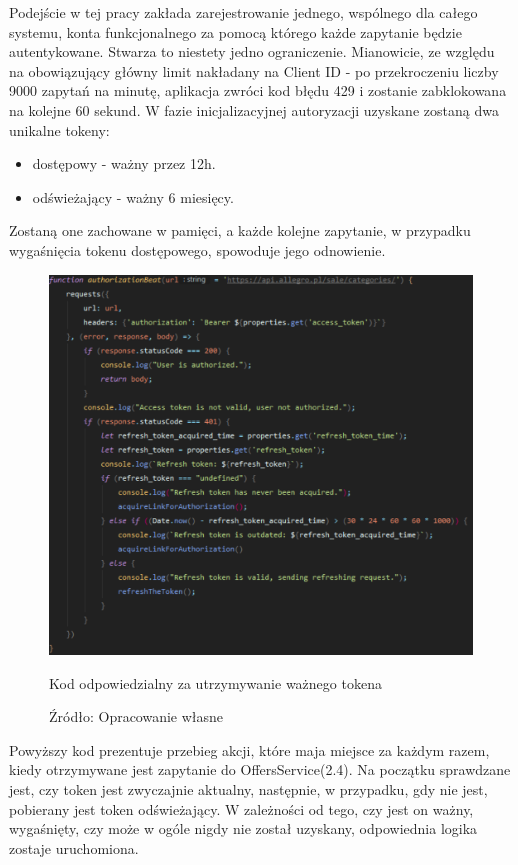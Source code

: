 Podejście w tej pracy zakłada zarejestrowanie jednego, wspólnego dla całego systemu, konta funkcjonalnego za pomocą którego każde zapytanie będzie autentykowane. Stwarza to niestety jedno ograniczenie. Mianowicie, ze względu na obowiązujący główny limit nakładany na Client ID  - po przekroczeniu liczby 9000 zapytań na minutę, aplikacja zwróci kod błędu 429 i zostanie zabklokowana na kolejne 60 sekund.
W fazie inicjalizacyjnej autoryzacji uzyskane zostaną dwa unikalne tokeny: 
\begin{itemize}
	\item dostępowy - ważny przez 12h.
	\item odświeżający - ważny 6 miesięcy.
\end{itemize}
Zostaną one zachowane w pamięci, a każde kolejne zapytanie, w przypadku wygaśnięcia tokenu dostępowego, spowoduje jego odnowienie.
\begin{figure}[H]
	\centering
	\includegraphics[width=\linewidth]{authorization.pdf}
	\caption{Kod odpowiedzialny za utrzymywanie ważnego tokena}
	\caption*{Źródło: {Opracowanie własne}}
\end{figure}
Powyższy kod prezentuje przebieg akcji, które maja miejsce za każdym razem, kiedy otrzymywane jest zapytanie do OffersService(2.4). Na początku sprawdzane jest, czy token jest zwyczajnie aktualny, następnie, w przypadku, gdy nie jest, pobierany jest token odświeżający. W zależności od tego, czy jest on ważny, wygaśnięty, czy może w ogóle nigdy nie został uzyskany, odpowiednia logika zostaje uruchomiona.

